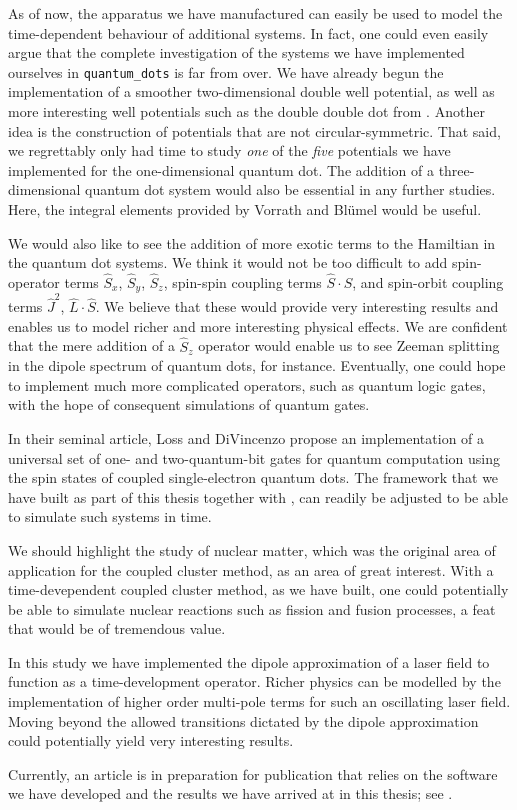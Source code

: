As of now, the apparatus we have manufactured can easily be used to model 
the time-dependent behaviour of additional systems. In fact, one could even 
easily argue that the complete investigation of the systems we have implemented 
ourselves in \lstinline{quantum_dots} is far from over. We have already begun
the implementation of a smoother two-dimensional double well potential, as well as 
more interesting well potentials such as the double double dot 
from \citeauthor{nielsen2012configuration} \cite{nielsen2012configuration}. Another 
idea is the construction of potentials that are not circular-symmetric.
That said, we regrettably only had time to study \emph{one} of the
\emph{five} potentials we have implemented for the one-dimensional quantum dot.
The addition of a three-dimensional quantum dot system would also be essential 
in any further studies. Here, the integral elements provided by
Vorrath and Blümel \cite{vorrath2003electronic} would be useful.

We would also like to see the addition of more exotic terms to the Hamiltian in the 
quantum dot systems. We think it would not be too difficult to add spin-operator 
terms $\hat{S}_x$, $\hat{S}_y$, $\hat{S}_z$, spin-spin coupling terms
$\hat{S}\cdot\hat{S}$, and spin-orbit
coupling terms $\hat{J}^2$, $\hat{L}\cdot\hat{S}$. We believe that these would provide 
very interesting results and enables us to model richer and more interesting physical
effects. We are 
confident that the 
mere addition of a $\hat{S}_z$ operator would enable us to see Zeeman splitting in 
the dipole spectrum of quantum dots, for instance. Eventually, one could hope to 
implement much more complicated operators, such as quantum logic gates, with the 
hope of consequent simulations of quantum gates.

In their seminal article, Loss and DiVincenzo \cite{loss1998quantum} propose 
an implementation of a universal set of one- and two-quantum-bit gates for quantum
computation using the spin states of coupled single-electron quantum dots. The framework 
that we have built as part of this thesis together with \citeauthor{islandwind2019}, 
can readily be adjusted to be able to simulate such systems in time.

We should highlight the study of nuclear matter, which was the original area 
of application for the coupled cluster method, as an area of great interest. With 
a time-devependent coupled cluster method, as we have built, one could potentially be able
to simulate  
nuclear reactions such as fission and fusion processes, a feat that would be of 
tremendous value.

In this study we have implemented the dipole approximation of a laser field to function 
as a time-development operator. 
Richer physics can be modelled by the implementation of higher order 
multi-pole terms for such an oscillating laser field. Moving beyond the allowed transitions
dictated by the dipole approximation could potentially yield very interesting results.

Currently, an article is in preparation for publication that relies on the 
software we have developed and the results we have arrived at in this thesis;
see \citeauthor{kristiansen2019time} \cite{kristiansen2019time}.

\clearemptydoublepage
